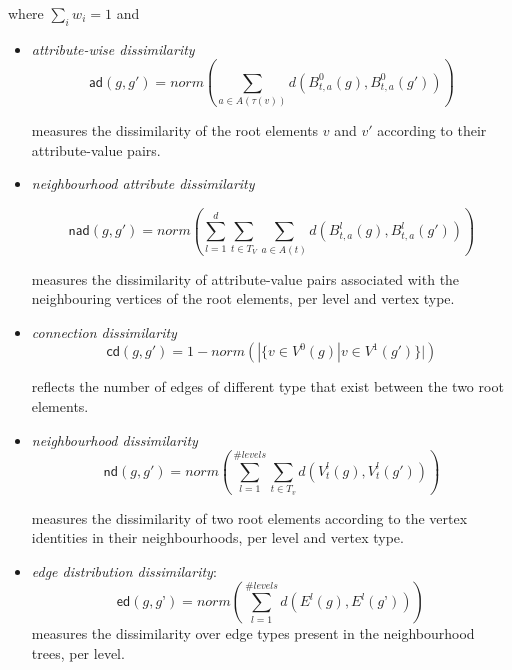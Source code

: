 where $\sum_i w_i=1$ and
	\begin{itemize}
		\item \textit{attribute-wise dissimilarity}
			{
			\begin{equation}
				\mathsf{ad}(g,g') = norm\left( \sum_{a \in A(\tau(v))} d(B^0_{t,a}(g), B^0_{t,a}(g')) \right)
			\end{equation}
			}
			
			measures the dissimilarity of the root elements $v$ and $v'$ according to their attribute-value pairs.
			
		\item \textit{neighbourhood attribute dissimilarity}

			{
			\begin{equation}
				\mathsf{nad}(g,g') = norm \left( \sum_{l=1}^{d} \sum_{t \in T_{V}} \sum_{a \in A(t)} d(B^l_{t,a}(g), B^l_{t,a}(g')) \right)
			\end{equation} 
			}
			
			measures the dissimilarity of attribute-value pairs associated with the neighbouring vertices of the root elements, per level and vertex type.
			
		\item \textit{connection dissimilarity}
			{
			\begin{equation}
				\mathsf{cd}(g,g') = 1 - norm \left(| \{ v \in V^0(g) | v \in V^1(g') \} | \right) 
			\end{equation}
			}
			
			reflects the number of edges of different type that exist between the two root elements.
			
		\item \textit{neighbourhood dissimilarity}
			{
			\begin{equation}
				\mathsf{nd}(g,g') = norm \left(\sum_{l=1}^{\#levels} \sum_{t \in T_{v}} d( V^l_{t}(g), V^l_{t}(g')) \right)
			\end{equation}
			}
			
			measures the dissimilarity of two root elements according to the vertex identities in their neighbourhoods, per level and vertex type.
			
		\item \textit{edge distribution dissimilarity}:
			\begin{equation}
				\mathsf{ed}(g,g’) = norm \left(\sum_{l=1}^{\#levels} d(E^l(g), E^l(g’)) \right)\,
			\end{equation}
			measures the dissimilarity over edge types present in the neighbourhood trees, per  level.
	\end{itemize}
	
